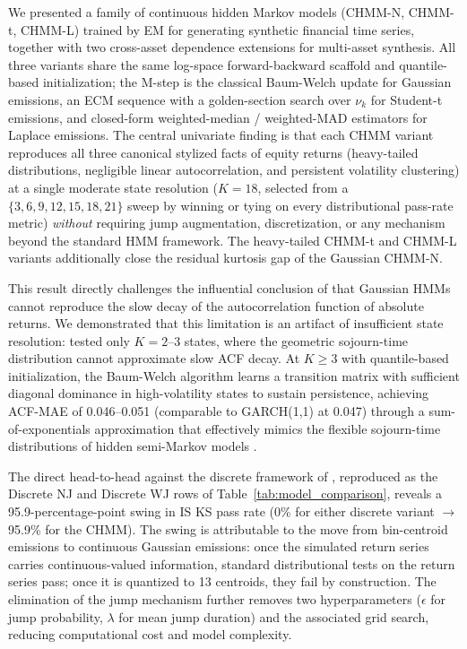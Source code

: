 We presented a family of continuous hidden Markov models (CHMM-N, CHMM-t, CHMM-L) trained by EM for generating synthetic financial time series, together with two cross-asset dependence extensions for multi-asset synthesis.
All three variants share the same log-space forward-backward scaffold and quantile-based initialization; the M-step is the classical Baum-Welch update for Gaussian emissions, an ECM sequence with a golden-section search over $\nu_k$ for Student-t emissions, and closed-form weighted-median / weighted-MAD estimators for Laplace emissions.
The central univariate finding is that each CHMM variant reproduces all three canonical stylized facts of equity returns (heavy-tailed distributions, negligible linear autocorrelation, and persistent volatility clustering) at a single moderate state resolution ($K = 18$, selected from a $\{3, 6, 9, 12, 15, 18, 21\}$ sweep by winning or tying on every distributional pass-rate metric) \emph{without} requiring jump augmentation, discretization, or any mechanism beyond the standard HMM framework.
The heavy-tailed CHMM-t and CHMM-L variants additionally close the residual kurtosis gap of the Gaussian CHMM-N.

This result directly challenges the influential conclusion of \citet{ryden1998stylized} that Gaussian HMMs cannot reproduce the slow decay of the autocorrelation function of absolute returns.
We demonstrated that this limitation is an artifact of insufficient state resolution: \citet{ryden1998stylized} tested only $K = 2$--$3$ states, where the geometric sojourn-time distribution cannot approximate slow ACF decay.
At $K \geq 3$ with quantile-based initialization, the Baum-Welch algorithm learns a transition matrix with sufficient diagonal dominance in high-volatility states to sustain persistence, achieving ACF-MAE of 0.046--0.051 (comparable to GARCH(1,1) at 0.047) through a sum-of-exponentials approximation that effectively mimics the flexible sojourn-time distributions of hidden semi-Markov models \cite{bulla2006stylized}.

The direct head-to-head against the discrete framework of \citet{alswaidan2026hybrid}, reproduced as the Discrete NJ and Discrete WJ rows of Table~\ref{tab:model_comparison}, reveals a 95.9-percentage-point swing in IS KS pass rate (0\% for either discrete variant $\to$ 95.9\% for the CHMM).
The swing is attributable to the move from bin-centroid emissions to continuous Gaussian emissions: once the simulated return series carries continuous-valued information, standard distributional tests on the return series pass; once it is quantized to 13 centroids, they fail by construction.
The elimination of the jump mechanism further removes two hyperparameters ($\epsilon$ for jump probability, $\lambda$ for mean jump duration) and the associated grid search, reducing computational cost and model complexity.

